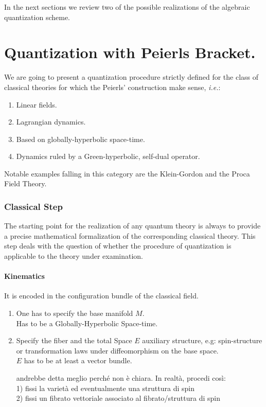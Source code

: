 \documentclass[Main]{subfiles}
\begin{document}
In the next sections we review two of the possible realizations of the algebraic quantization scheme.

\section{Quantization with Peierls Bracket.}
	We are going to present a quantization procedure strictly defined for the class of classical theories for which the Peierls' construction make sense, \textit{i.e.}:
	\begin{enumerate}
		\item Linear fields.
		\item Lagrangian dynamics.
		\item Based on globally-hyperbolic space-time.
		\item Dynamics ruled by a Green-hyperbolic, self-dual operator.	
	\end{enumerate}
	Notable examples falling in this category are the
	Klein-Gordon and the  Proca Field Theory\cite{Benini}.

	\subsubsection{Classical Step}%
	The starting point for the realization of any quantum theory is always to provide a precise mathematical formalization of the corresponding classical theory.
	This step deals with the question of whether the procedure of quantization is applicable to the theory under examination.
	
		\paragraph{Kinematics}
		It is encoded in the configuration bundle of the classical field.
   					\begin{enumerate}
   						\item One has to specify the base manifold $M$. \\Has to be a Globally-Hyperbolic Space-time.
   						\item\label{Step:AuxiliaryStructure} Specify the fiber and the total Space $E$ auxiliary structure, e.g: spin-structure or transformation laws under diffeomorphism on the base space.\\$E$ has to be at least a vector bundle.
   						\begin{Warning}
   							andrebbe detta meglio perché non è chiara. In realtà, procedi così:\\
   							1) fissi la varietà ed eventualmente una struttura di spin \\
   							2) fissi un fibrato vettoriale associato al fibrato/struttura di spin
   						\end{Warning}
   					\end{enumerate}
   		
\end{document}
